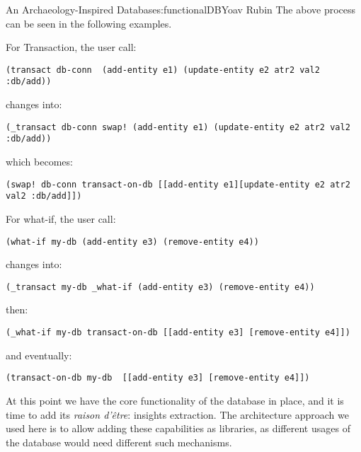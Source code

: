 \begin{aosachapter}{An Archaeology-Inspired Database}{s:functionalDB}{Yoav Rubin}
The above process can be seen in the following examples.

For Transaction, the user call:

\begin{verbatim}
(transact db-conn  (add-entity e1) (update-entity e2 atr2 val2 :db/add))  
\end{verbatim}

changes into:

\begin{verbatim}
(_transact db-conn swap! (add-entity e1) (update-entity e2 atr2 val2 :db/add))
\end{verbatim}

which becomes:

\begin{verbatim}
(swap! db-conn transact-on-db [[add-entity e1][update-entity e2 atr2 val2 :db/add]])
\end{verbatim}

For what-if, the user call:

\begin{verbatim}
(what-if my-db (add-entity e3) (remove-entity e4))
\end{verbatim}

changes into:

\begin{verbatim}
(_transact my-db _what-if (add-entity e3) (remove-entity e4))
\end{verbatim}

then:

\begin{verbatim}
(_what-if my-db transact-on-db [[add-entity e3] [remove-entity e4]])
\end{verbatim}

and eventually:

\begin{verbatim}
(transact-on-db my-db  [[add-entity e3] [remove-entity e4]])
\end{verbatim}

\label{insight-extraction-as-libraries}

At this point we have the core functionality of the database in place,
and it is time to add its \emph{raison d'être}: insights extraction. The
architecture approach we used here is to allow adding these capabilities
as libraries, as different usages of the database would need different
such mechanisms.

\label{graph-traversal}


\end{aosachapter}
